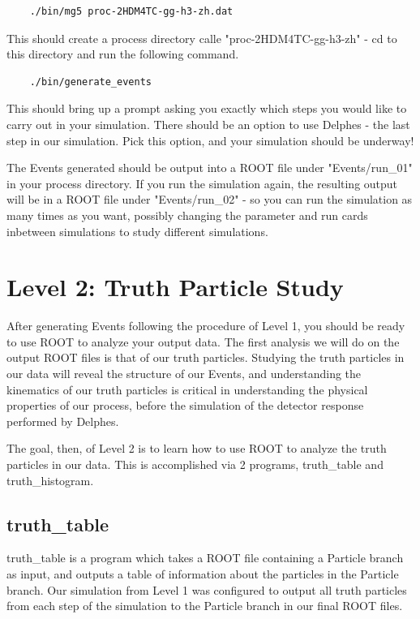 \documentclass{article}
\begin{document}
\begin{verbatim}
	./bin/mg5 proc-2HDM4TC-gg-h3-zh.dat
\end{verbatim}

This should create a process directory calle "proc-2HDM4TC-gg-h3-zh" - cd to this directory and run the following command.

\begin{verbatim}
	./bin/generate_events
\end{verbatim}

This should bring up a prompt asking you exactly which steps you would like to carry out in your simulation. There should be an option to use Delphes - the last step in our simulation. Pick this option, and your simulation should be underway!

\bigskip

The Events generated should be output into a ROOT file under "Events/run\_01" in your process directory. If you run the simulation again, the resulting output will be in a ROOT file under "Events/run\_02" - so you can run the simulation as many times as you want, possibly changing the parameter and run cards inbetween simulations to study different simulations.

\section{Level 2: Truth Particle Study}

After generating Events following the procedure of Level 1, you should be ready to use ROOT to analyze your output data. The first analysis we will do on the output ROOT files is that of our truth particles. Studying the truth particles in our data will reveal the structure of our Events, and understanding the kinematics of our truth particles is critical in understanding the physical properties of our process, before the simulation of the detector response performed by Delphes.

\bigskip

The goal, then, of Level 2 is to learn how to use ROOT to analyze the truth particles in our data. This is accomplished via 2 programs, truth\_table and truth\_histogram.

\subsection{truth\_table}

truth\_table is a program which takes a ROOT file containing a Particle branch as input, and outputs a table of information about the particles in the Particle branch. Our simulation from Level 1 was configured to output all truth particles from each step of the simulation to the Particle branch in our final ROOT files.
\end{document}
